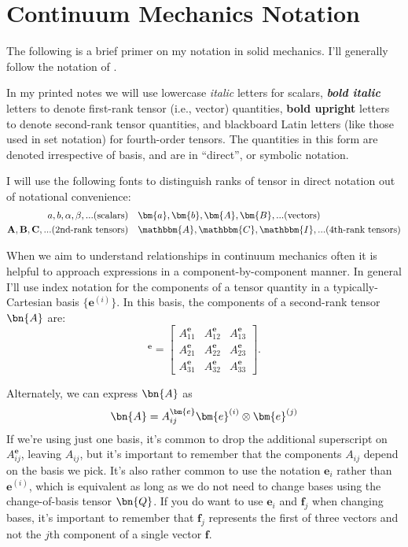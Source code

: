 \section*{Continuum Mechanics Notation} 

The following is a brief primer on my notation in solid mechanics. 
I'll generally follow the notation of \citet{holzapfelNonlinearSolidMechanics2002}. 


In my printed notes we will use lowercase \textit{italic} letters for scalars, \textit{\textbf{bold italic}} letters to denote first-rank tensor (i.e., vector) quantities, \textbf{bold upright} letters to denote second-rank tensor quantities, and blackboard Latin letters (like those used in set notation) for fourth-order tensors. 
The quantities in this form are denoted irrespective of basis, and are in ``direct'', or symbolic notation. 

\noindent I will use the following fonts to distinguish ranks of tensor in direct notation out of notational convenience:
\begin{eqnarray*}
a, b, \alpha, \beta, ... (\textrm{scalars}) & ~~~ \bm{a}, \bm{b}, \bm{A}, \bm{B}, ... (\textrm{vectors})\\
\mathbf{A}, \mathbf{B}, \mathbf{C}, ...(\textrm{2nd-rank tensors}) & ~~~ \mathbbm{A}, \mathbbm{C}, \mathbbm{I},... (\textrm{4th-rank tensors})
\end{eqnarray*}
    
When we aim to understand relationships in continuum mechanics often it is helpful to approach expressions in a component-by-component manner. 
In general I'll use index notation for the components of a tensor quantity in a typically-Cartesian basis $\{\bm{e}^{(i)}\}$. 
In this basis, the components of a second-rank tensor $\bn{A}$ are:
\begin{equation*}
    [\bn{A}]^{\bm{e}} = \begin{bmatrix}
A_{11}^{\bm{e}}  & A_{12}^{\bm{e}}  & A_{13}^{\bm{e}} \\
A_{21}^{\bm{e}}  & A_{22}^{\bm{e}}  & A_{23}^{\bm{e}} \\
A_{31}^{\bm{e}}  & A_{32}^{\bm{e}}  & A_{33}^{\bm{e}} 
\end{bmatrix}.
\end{equation*}

Alternately, we can express $\bn{A}$ as
\begin{equation*}
    \bn{A} = A_{ij}^{\bm{e}} \bm{e}^{(i)} \otimes \bm{e}^{(j)}
\end{equation*}
If we're using just one basis, it's common to drop the additional superscript on $A_{ij}^{\bm{e}}$, leaving $A_{ij}$, but it's important to remember that the components $A_{ij}$ depend on the basis we pick.
It's also rather common to use the notation $\bm{e}_i$ rather than $\bm{e}^{(i)}$, which is equivalent as long as we do not need to change bases using the change-of-basis tensor $\bn{Q}$. 
If you do want to use $\bm{e}_i$ and $\bm{f}_j$ when changing bases, it's important to remember that $\bm{f}_j$ represents the first of three vectors and not the $j$th component of a single vector $\bm{f}$. 


